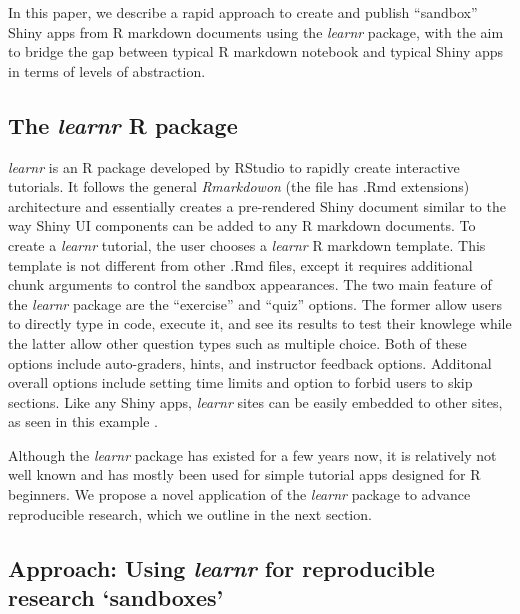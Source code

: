 In this paper, we describe a rapid approach to create and publish
``sandbox'' Shiny apps from R markdown documents using the \emph{learnr}
package, with the aim to bridge the gap between typical R markdown
notebook and typical Shiny apps in terms of levels of abstraction.

\hypertarget{the-learnr-r-package}{%
\subsection{\texorpdfstring{The \emph{learnr} R
package}{The learnr R package}}\label{the-learnr-r-package}}

\emph{learnr} \citep{learnr} is an R package developed by RStudio to
rapidly create interactive tutorials. It follows the general
\emph{Rmarkdowon} (the file has .Rmd extensions) architecture and
essentially creates a pre-rendered Shiny document similar to the way
Shiny UI components can be added to any R markdown documents. To create
a \emph{learnr} tutorial, the user chooses a \emph{learnr} R markdown
template. This template is not different from other .Rmd files, except
it requires additional chunk arguments to control the sandbox
appearances. The two main feature of the \emph{learnr} package are the
``exercise'' and ``quiz'' options. The former allow users to directly
type in code, execute it, and see its results to test their knowlege
while the latter allow other question types such as multiple choice.
Both of these options include auto-graders, hints, and instructor
feedback options. Additonal overall options include setting time limits
and option to forbid users to skip sections. Like any Shiny apps,
\emph{learnr} sites can be easily embedded to other sites, as seen in
this example \citep{rmrwr}.

Although the \emph{learnr} package has existed for a few years now, it
is relatively not well known and has mostly been used for simple
tutorial apps designed for R beginners. We propose a novel application
of the \emph{learnr} package to advance reproducible research, which we
outline in the next section.

\hypertarget{approach-using-learnr-for-reproducible-research-sandboxes}{%
\subsection{\texorpdfstring{Approach: Using \emph{learnr} for
reproducible research
`sandboxes'}{Approach: Using learnr for reproducible research `sandboxes'}}\label{approach-using-learnr-for-reproducible-research-sandboxes}}

